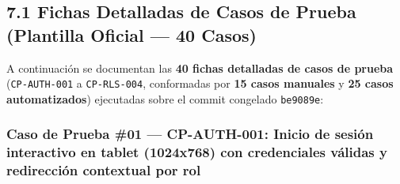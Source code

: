 \documentclass[10pt,a4paper]{article}
\begin{document}
\subsection{7.1 Fichas Detalladas de Casos de Prueba (Plantilla Oficial --- 40 Casos)}\label{71-fichas-detalladas-de-casos-de-prueba-plantilla-oficial--40-casos}

A continuación se documentan las \textbf{40 fichas detalladas de casos de prueba} (\texttt{CP-{}\allowbreak{}AUTH-{}\allowbreak{}001} a \texttt{CP-{}\allowbreak{}RLS-{}\allowbreak{}004}, conformadas por \textbf{15 casos manuales} y \textbf{25 casos automatizados}) ejecutadas sobre el commit congelado \texttt{be9089e}:


\subsubsection{Caso de Prueba \#01 --- CP-AUTH-001: Inicio de sesión interactivo en tablet (1024x768) con credenciales válidas y redirección contextual por rol}\label{caso-de-prueba-01--cp-auth-001-inicio-de-sesiuxf3n-interactivo-en-tablet-1024x768-con-credenciales-vuxe1lidas-y-redirecciuxf3n-contextual-por-rol}

\begingroup\singlespacing\footnotesize\setlength{\parskip}{0pt}
\end{document}
